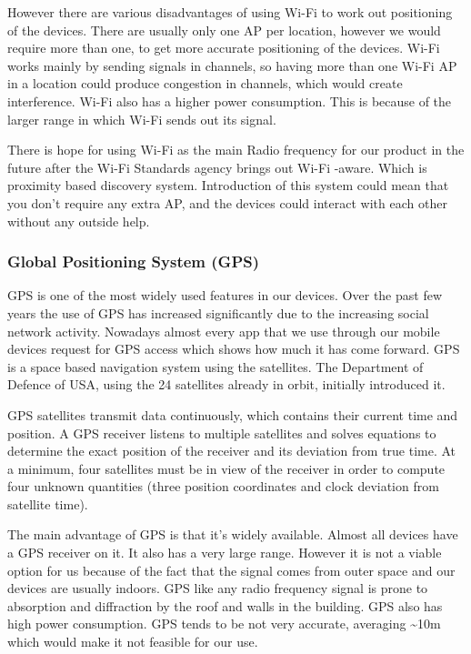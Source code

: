 However there are various disadvantages of using Wi-Fi to work out
positioning of the devices. There are usually only one AP per location,
however we would require more than one, to get more accurate positioning
of the devices. Wi-Fi works mainly by sending signals in channels,
so having more than one Wi-Fi AP in a location could produce congestion
in channels, which would create interference. Wi-Fi also has a higher
power consumption. This is because of the larger range in which Wi-Fi
sends out its signal. 

There is hope for using Wi-Fi as the main Radio frequency for our
product in the future after the Wi-Fi Standards agency brings out
Wi-Fi -aware. Which is proximity based discovery system. Introduction
of this system could mean that you don\textquoteright t require any
extra AP, and the devices could interact with each other without any
outside help. 


\subsubsection{Global Positioning System (GPS)}

GPS is one of the most widely used features in our devices. Over the
past few years the use of GPS has increased significantly due to the
increasing social network activity. Nowadays almost every app that
we use through our mobile devices request for GPS access which shows
how much it has come forward. GPS is a space based navigation system
using the satellites. The Department of Defence of USA, using the
24 satellites already in orbit, initially introduced it. 

GPS satellites transmit data continuously, which contains their current
time and position. A GPS receiver listens to multiple satellites and
solves equations to determine the exact position of the receiver and
its deviation from true time. At a minimum, four satellites must be
in view of the receiver in order to compute four unknown quantities
(three position coordinates and clock deviation from satellite time). 

The main advantage of GPS is that it\textquoteright s widely available.
Almost all devices have a GPS receiver on it. It also has a very large
range. However it is not a viable option for us because of the fact
that the signal comes from outer space and our devices are usually
indoors. GPS like any radio frequency signal is prone to absorption
and diffraction by the roof and walls in the building. GPS also has
high power consumption. GPS tends to be not very accurate, averaging
\textasciitilde{}10m which would make it not feasible for our use. 


